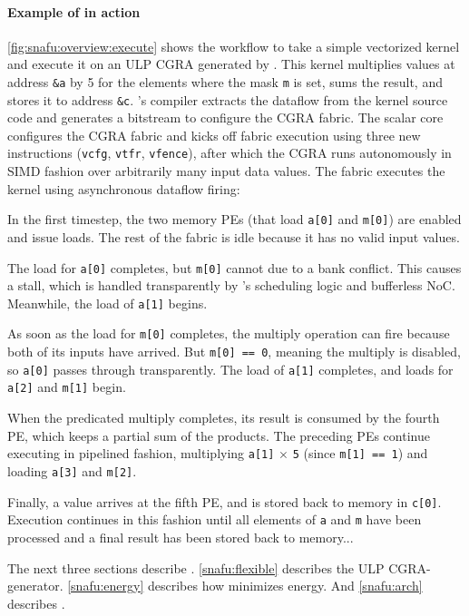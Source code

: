 \figSNAFUOverviewExecute

\paragraph{Example of \snafu in action}
\autoref{fig:snafu:overview:execute} shows the workflow to take a simple vectorized kernel and execute it on an ULP CGRA generated by \snafuframe.
%
This kernel multiplies values at address {\tt \&a} by 5 for the elements where the mask {\tt m} is set,
  sums the result, and stores it to address {\tt \&c}.
% 
\snafuframe's compiler extracts the dataflow from the kernel source code and generates a bitstream to configure the CGRA fabric.
%
The scalar core configures the CGRA fabric and kicks off fabric execution using three new instructions ({\tt vcfg}, {\tt vtfr}, {\tt vfence}),
after which the CGRA runs autonomously in SIMD fashion over arbitrarily many input data values.
% 
The fabric executes the kernel using asynchronous dataflow firing:
\begin{compactitem}
\item[\circled{1}]
In the first timestep, the two memory PEs (that load {\tt a[0]} and {\tt m[0]}) are enabled and issue loads.
%
The rest of the fabric is idle because it has no valid input values.
\item[\circled{2}]
The load for {\tt a[0]} completes, but {\tt m[0]} cannot due to a bank conflict.
%
This causes a stall, which is handled transparently by \snafuframe's scheduling logic and bufferless NoC.
%
Meanwhile, the load of {\tt a[1]} begins.
%
\item[\circled{3}]
% 
As soon as the load for {\tt m[0]} completes, the multiply operation can fire because both of its inputs have arrived.
% 
But {\tt m[0] == 0}, meaning the multiply is disabled, so {\tt a[0]} passes through transparently.
%
The load of {\tt a[1]} completes, and loads for {\tt a[2]} and {\tt m[1]} begin.
%
\item[\circled{4}]
%
When the predicated multiply completes, its result is consumed by the fourth PE, which keeps a partial sum of the products.
%
The preceding PEs continue executing in pipelined fashion,
multiplying {\tt a[1]} $\times$ {\tt 5} (since {\tt m[1] == 1}) and loading {\tt a[3]} and {\tt m[2]}.
%
\item[\circled{5}]
%
Finally, a value arrives at the fifth PE, and is stored back to memory in {\tt c[0]}.
%
Execution continues in this fashion until all elements of {\tt a} and {\tt m} have been processed and a final result has been stored back to memory...
\end{compactitem}

\noindent
The next three sections describe \snafuframe.
% 
\autoref{snafu:flexible} describes the \snafuframe ULP CGRA-generator.
% 
\autoref{snafu:energy} describes how \snafuframe minimizes energy.
% 
And \autoref{snafu:arch} describes \snafuarch.

